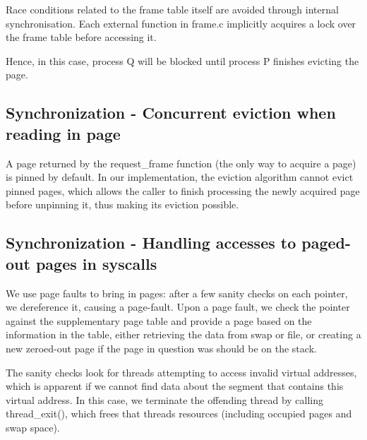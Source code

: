 Race conditions related to the frame table itself are avoided through internal synchronisation. Each external function in frame.c implicitly acquires a lock over the frame table before accessing it.

Hence, in this case, process Q will be blocked until process P finishes evicting the page.

\subsection{Synchronization - Concurrent eviction when reading in page}

A page returned by the request\_frame function (the only way to acquire a page) is pinned by default.
In our implementation, the eviction algorithm cannot evict pinned pages, which allows the caller to finish processing the newly acquired page before unpinning it, thus making its eviction possible.

\subsection{Synchronization - Handling accesses to paged-out pages in syscalls}

We use page faults to bring in pages: after a few sanity checks on each pointer, we dereference it, causing a page-fault.
Upon a page fault, we check the pointer against the supplementary page table and provide a page based on the information in the table, either retrieving the data from swap or file, or creating a new zeroed-out page if the page in question was should be on the stack.

The sanity checks look for threads attempting to access invalid virtual addresses, which is apparent if we cannot find data about the segment that contains this virtual address. In this case, we terminate the offending thread by calling thread\_exit(), which frees that threads resources (including occupied pages and swap space).

